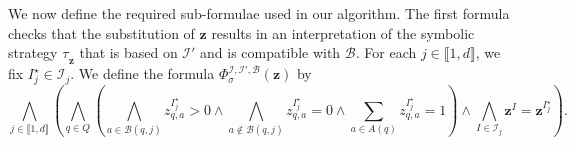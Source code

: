 \documentclass[a4paper,UKenglish,cleveref,autoref,thm-restate,colorlinks]{lipics-v2021}
\newcommand{\integerInterval}[1]{\llbracket{}#1\rrbracket{}}
\newcommand{\ocStateSpace}{Q}
\newcommand{\ocState}{q}
\newcommand{\ocActionSpace}{A}
\newcommand{\ocAction}{a}
\newcommand{\intPart}{\mathcal{I}}
\newcommand{\interval}{I}
\newcommand{\intNum}{d}
\newcommand{\intIndex}{j}
\newcommand{\varStrat}{z}
\newcommand{\varStratI}{\mathbf{\varStrat}^{\interval}}
\newcommand{\varStratIstar}{\mathbf{\varStrat}^{\interval_\intIndex^{\star}}}
\newcommand{\varStratTuple}{\mathbf{\varStrat}}
\newcommand{\formulaStratBase}{\Phi_{\strat}}
\newcommand{\suppBounded}{\mathcal{B}}
\newcommand{\formulaStratB}{\formulaStratBase^{\intPart,\intPart',\suppBounded}}
\newcommand{\stratGeneric}[1]{{\sigma_{#1}}}
\newcommand{\strat}{\stratGeneric{}}
\newcommand{\stratBGeneric}[1]{{\tau_{#1}}}
\newcommand{\stratB}{\stratBGeneric{}}
\begin{document}
We now define the required sub-formulae used in our algorithm.
The first formula checks that the substitution of $\varStratTuple$ results in an interpretation of the symbolic strategy $\stratB_{\varStratTuple}$  that is based on $\intPart'$ and is compatible with $\suppBounded$.
For each $\intIndex\in\integerInterval{1, \intNum}$, we fix $\interval_{\intIndex}^\star\in\intPart_\intIndex$.
We define the formula $\formulaStratB(\varStratTuple)$ by 
\begin{equation}\label{equation:formula:strategy:assigned-support}
    \bigwedge_{\intIndex\in\integerInterval{1, \intNum}}
    \left(
    \bigwedge_{\ocState\in\ocStateSpace}\left(
      \bigwedge_{\ocAction\in\suppBounded(\ocState,\intIndex)}
      \varStrat_{\ocState,\ocAction}^{\interval^\star_\intIndex} > 0\land
      \bigwedge_{\ocAction\notin\suppBounded(\ocState,\intIndex)}
      \varStrat_{\ocState,\ocAction}^{\interval^\star_\intIndex} = 0\land
      \sum_{\ocAction\in\ocActionSpace(\ocState)}    \varStrat_{\ocState,\ocAction}^{\interval^\star_\intIndex} = 1
    \right)\land
    \bigwedge_{\interval\in\intPart_\intIndex}
    \varStratI = \varStratIstar
  \right).
\end{equation}
\end{document}
